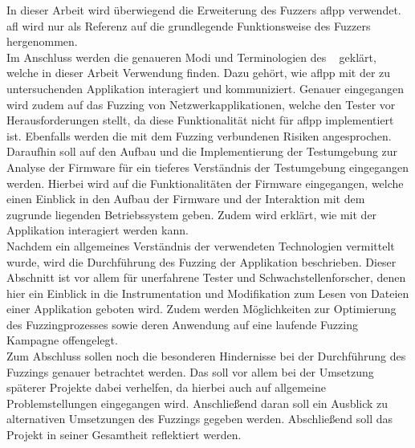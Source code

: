 In dieser Arbeit wird überwiegend die Erweiterung des Fuzzers \gls{aflpp} verwendet.
\gls{afl} wird nur als Referenz auf die grundlegende Funktionsweise des Fuzzers hergenommen.\\
\linebreak
Im Anschluss werden die genaueren Modi und Terminologien des ~\cite{AFLplusplus-Woot20} geklärt, welche in dieser Arbeit Verwendung finden.
Dazu gehört, wie \gls{aflpp} mit der zu untersuchenden Applikation interagiert und kommuniziert.
Genauer eingegangen wird zudem auf das Fuzzing von Netzwerkapplikationen, welche den Tester vor Herausforderungen stellt, da diese Funktionalität nicht für \gls{aflpp} implementiert ist.
Ebenfalls werden die mit dem Fuzzing verbundenen Risiken angesprochen. \\
\linebreak
Daraufhin soll auf den Aufbau und die Implementierung der Testumgebung zur Analyse der Firmware für ein tieferes
Verständnis der Testumgebung eingegangen werden.
Hierbei wird auf die Funktionalitäten der Firmware eingegangen, welche einen Einblick in den Aufbau der Firmware und der Interaktion mit dem zugrunde liegenden
Betriebssystem geben.
Zudem wird erklärt, wie mit der Applikation interagiert werden kann.\\
\linebreak
Nachdem ein allgemeines Verständnis der verwendeten Technologien vermittelt wurde, wird die Durchführung des Fuzzing der Applikation beschrieben.
Dieser Abschnitt ist vor allem für unerfahrene Tester und Schwachstellenforscher, denen hier ein Einblick in die
Instrumentation und Modifikation zum Lesen von Dateien einer Applikation geboten wird.
Zudem werden Möglichkeiten zur Optimierung des Fuzzingprozesses sowie deren Anwendung auf eine laufende Fuzzing Kampagne offengelegt. \\
\linebreak
Zum Abschluss sollen noch die besonderen Hindernisse bei der Durchführung des Fuzzings genauer betrachtet werden.
Das soll vor allem bei der Umsetzung späterer Projekte dabei verhelfen, da hierbei auch auf allgemeine Problemstellungen eingegangen wird.
Anschließend daran soll ein Ausblick zu alternativen Umsetzungen des Fuzzings gegeben werden.
Abschließend soll das Projekt in seiner Gesamtheit reflektiert werden.


